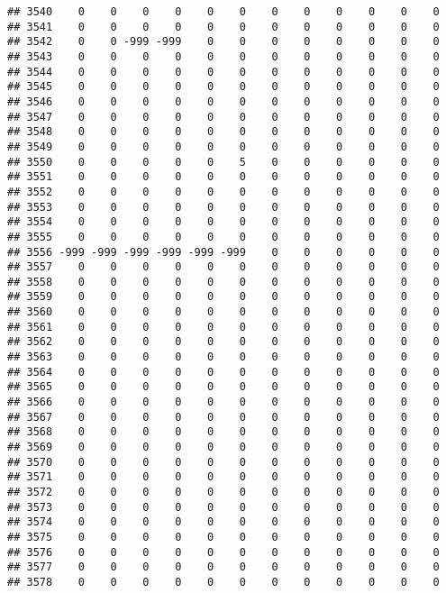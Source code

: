 \documentclass[]{article}
\begin{document}
\begin{verbatim}
## 3540    0    0    0    0    0    0    0    0    0    0    0    0
## 3541    0    0    0    0    0    0    0    0    0    0    0    0
## 3542    0    0 -999 -999    0    0    0    0    0    0    0    0
## 3543    0    0    0    0    0    0    0    0    0    0    0    0
## 3544    0    0    0    0    0    0    0    0    0    0    0    0
## 3545    0    0    0    0    0    0    0    0    0    0    0    0
## 3546    0    0    0    0    0    0    0    0    0    0    0    0
## 3547    0    0    0    0    0    0    0    0    0    0    0    0
## 3548    0    0    0    0    0    0    0    0    0    0    0    0
## 3549    0    0    0    0    0    0    0    0    0    0    0    0
## 3550    0    0    0    0    0    5    0    0    0    0    0    0
## 3551    0    0    0    0    0    0    0    0    0    0    0    0
## 3552    0    0    0    0    0    0    0    0    0    0    0    0
## 3553    0    0    0    0    0    0    0    0    0    0    0    0
## 3554    0    0    0    0    0    0    0    0    0    0    0    0
## 3555    0    0    0    0    0    0    0    0    0    0    0    0
## 3556 -999 -999 -999 -999 -999 -999    0    0    0    0    0    0
## 3557    0    0    0    0    0    0    0    0    0    0    0    0
## 3558    0    0    0    0    0    0    0    0    0    0    0    0
## 3559    0    0    0    0    0    0    0    0    0    0    0    0
## 3560    0    0    0    0    0    0    0    0    0    0    0    0
## 3561    0    0    0    0    0    0    0    0    0    0    0    0
## 3562    0    0    0    0    0    0    0    0    0    0    0    0
## 3563    0    0    0    0    0    0    0    0    0    0    0    0
## 3564    0    0    0    0    0    0    0    0    0    0    0    0
## 3565    0    0    0    0    0    0    0    0    0    0    0    0
## 3566    0    0    0    0    0    0    0    0    0    0    0    0
## 3567    0    0    0    0    0    0    0    0    0    0    0    0
## 3568    0    0    0    0    0    0    0    0    0    0    0    0
## 3569    0    0    0    0    0    0    0    0    0    0    0    0
## 3570    0    0    0    0    0    0    0    0    0    0    0    0
## 3571    0    0    0    0    0    0    0    0    0    0    0    0
## 3572    0    0    0    0    0    0    0    0    0    0    0    0
## 3573    0    0    0    0    0    0    0    0    0    0    0    0
## 3574    0    0    0    0    0    0    0    0    0    0    0    0
## 3575    0    0    0    0    0    0    0    0    0    0    0    0
## 3576    0    0    0    0    0    0    0    0    0    0    0    0
## 3577    0    0    0    0    0    0    0    0    0    0    0    0
## 3578    0    0    0    0    0    0    0    0    0    0    0    0

\end{verbatim}
\end{document}
